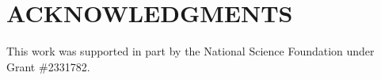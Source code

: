 \documentclass[letterpaper, 10 pt, conference]{ieeeconf}  %
\begin{document}


\section{ACKNOWLEDGMENTS}

This work was supported in part by the National Science
Foundation under Grant \#2331782.





\end{document}
